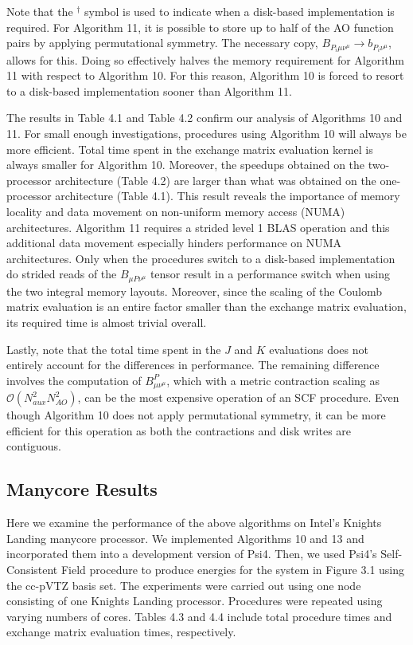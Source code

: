 Note that the $^{\dagger}$ symbol is used to indicate when a disk-based implementation is required. For Algorithm 11, it is possible
to store up to half of the AO function pairs by applying permutational symmetry. The necessary copy, 
$B_{P_i \mu \nu^{\mu}} \rightarrow b_{P_i \nu^{\mu}}$, allows for this. Doing so effectively halves the memory requirement for Algorithm 11
with respect to Algorithm 10. For this reason, Algorithm 10 is forced to resort to a disk-based implementation sooner than Algorithm 11.

The results in Table 4.1 and Table 4.2 confirm our analysis of Algorithms 10 and 11. For small enough investigations, procedures using Algorithm 10 will always be more
efficient. Total time spent in the exchange matrix evaluation kernel is always smaller for Algorithm 10. 
Moreover, the speedups obtained on the two-processor architecture (Table 4.2) are larger than what was obtained on the one-processor architecture (Table 4.1).
This result reveals the importance of memory locality and data movement on non-uniform memory access (NUMA) architectures. Algorithm 11 requires a strided level 1 BLAS operation and 
this additional data movement especially hinders performance on NUMA architectures.
Only when the procedures switch to a disk-based implementation
do strided reads of the $B_{\mu P \nu^\mu}$ tensor result in a performance switch when using the two integral memory layouts. 
Moreover, since the scaling of the Coulomb matrix evaluation is an entire factor smaller than the exchange matrix evaluation, its required time is almost trivial overall.

Lastly, note that the total time spent in the $J$ and $K$ evaluations does not entirely account for the differences in performance. The 
remaining difference involves the computation of $B^P_{\mu \nu^\mu}$, which with a metric contraction scaling as 
$\mathcal{O}(N_{aux}^2N_{AO}^2)$, can be the most expensive operation of an SCF procedure. Even though Algorithm 10 does not 
apply permutational symmetry, it can be more efficient for this operation as both the contractions and disk writes are contiguous.


\subsection{Manycore Results}

Here we examine the performance of the above algorithms on Intel's Knights Landing manycore processor. 
We implemented Algorithms 10 and 13 and incorporated them into a development version of {\sc Psi4}. 
Then, we used {\sc Psi4}'s Self-Consistent Field procedure to produce energies for the system in Figure 3.1 using the cc-pVTZ basis set. 
The experiments were carried out using one node consisting of one Knights Landing processor. Procedures were repeated using varying numbers of cores.
Tables 4.3 and 4.4 include total procedure times and exchange matrix evaluation times, respectively.   

